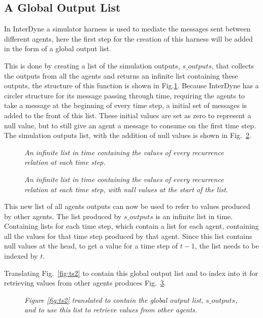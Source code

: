 \documentclass{article}
\begin{document}
\subsection{A Global Output List}
In InterDyne a simulator harness is used to mediate the messages sent between different agents, here the first step for the creation of this harness will be added in the form of a global output list. 

This is done by creating a list of the simulation outputs, $s\_outputs$, that collects the outputs from all the agents and returns an infinite list containing these outputs, the structure of this function is shown in Fig.\ref{fig:gl3}. Because InterDyne has a circler structure for its message passing through time, requiring the agents to take a message at the beginning of every time step, a initial set of messages is added to the front of this list. These initial values are set as zero to represent a null value, but to still give an agent a message to consume on the first time step. The simulation outputs list, with the addition of null values is shown in Fig.~\ref{fig:glnv3}. 
\begin{figure}[H]
	\centering
	
	\caption{\it  An infinite list in time containing the values of every recurrence relation at each time step.}
	\label{fig:gl3}
\end{figure}
\begin{figure}[H]
	\centering
	
	\caption{\it  An infinite list in time containing the values of every recurrence relation at each time step, with null values at the start of the list.  }
	\label{fig:glnv3}
\end{figure}  


This new list of all agents outputs can now be used to refer to values produced by other agents. The list produced by $s\_outputs$ is an infinite list in time. Containing lists for each time step, which contain a list for each agent, containing all the values for that time step produced by that agent. Since this list contains null values at the head, to get a value for a time step of $t-1$, the list needs to be indexed by $t$.

Translating Fig.~\ref{fig:ts2} to contain this global output list and to index into it for retrieving values from other agents produces Fig.~\ref{fig:ts3}.
\begin{figure}[H]
	\centering
	
	\caption{\it  Figure \ref{fig:ts2} translated to contain the global output list, $s\_outputs$, and to use this list to retrieve values from other agents.  }
	\label{fig:ts3}
\end{figure} 
\end{document}
